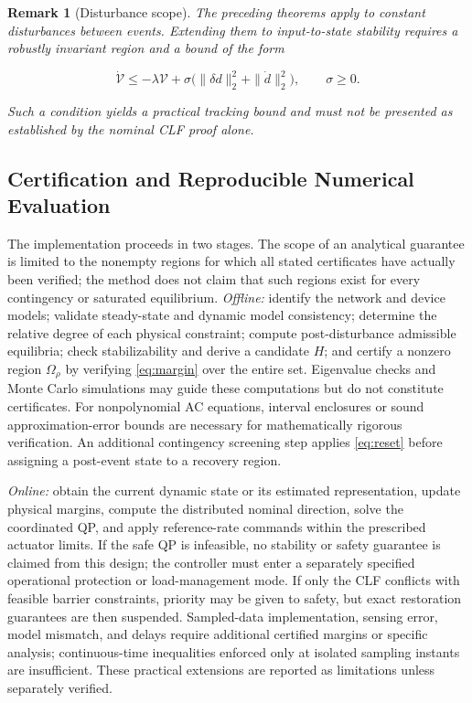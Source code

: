 \documentclass[11pt,twocolumn]{article}
\newtheorem{remark}{Remark}
\begin{document}
\begin{remark}[Disturbance scope]

The preceding theorems apply to constant disturbances between events. Extending them to input-to-state stability requires a robustly invariant region and a bound of the form

\begin{equation}\label{eq:iss}
\dot{\mathcal V}\leq-\lambda\mathcal V
+\sigma\big(\|\delta d\|_2^2+\|\dot d\|_2^2\big),\qquad\sigma\geq0.
\end{equation}

Such a condition yields a practical tracking bound and must not be presented as established by the nominal CLF proof alone.

\end{remark}

\subsection{Certification and Reproducible Numerical Evaluation}

\label{subsec:validation}

The implementation proceeds in two stages. The scope of an analytical guarantee is limited to the nonempty regions for which all stated certificates have actually been verified; the method does not claim that such regions exist for every contingency or saturated equilibrium. \emph{Offline:} identify the network and device models; validate steady-state and dynamic model consistency; determine the relative degree of each physical constraint; compute post-disturbance admissible equilibria; check stabilizability and derive a candidate $H$; and certify a nonzero region $\Omega_\rho$ by verifying \eqref{eq:margin} over the entire set. Eigenvalue checks and Monte Carlo simulations may guide these computations but do not constitute certificates. For nonpolynomial AC equations, interval enclosures or sound approximation-error bounds are necessary for mathematically rigorous verification. An additional contingency screening step applies \eqref{eq:reset} before assigning a post-event state to a recovery region.

\emph{Online:} obtain the current dynamic state or its estimated representation, update physical margins, compute the distributed nominal direction, solve the coordinated QP, and apply reference-rate commands within the prescribed actuator limits. If the safe QP is infeasible, no stability or safety guarantee is claimed from this design; the controller must enter a separately specified operational protection or load-management mode. If only the CLF conflicts with feasible barrier constraints, priority may be given to safety, but exact restoration guarantees are then suspended. Sampled-data implementation, sensing error, model mismatch, and delays require additional certified margins or specific analysis; continuous-time inequalities enforced only at isolated sampling instants are insufficient. These practical extensions are reported as limitations unless separately verified.
\end{document}
